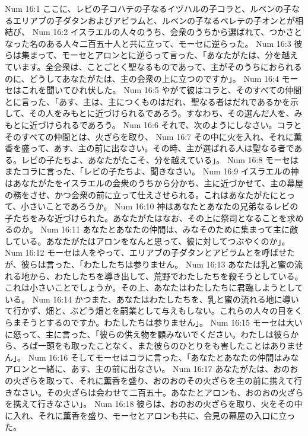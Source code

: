 Num 16:1  ここに、レビの子コハテの子なるイヅハルの子コラと、ルベンの子なるエリアブの子ダタンおよびアビラムと、ルベンの子なるペレテの子オンとが相結び、
Num 16:2  イスラエルの人々のうち、会衆のうちから選ばれて、つかさとなった名のある人々二百五十人と共に立って、モーセに逆らった。
Num 16:3  彼らは集まって、モーセとアロンとに逆らって言った、「あなたがたは、分を越えています。全会衆は、ことごとく聖なるものであって、主がそのうちにおられるのに、どうしてあなたがたは、主の会衆の上に立つのですか」。
Num 16:4  モーセはこれを聞いてひれ伏した。
Num 16:5  やがて彼はコラと、そのすべての仲間とに言った、「あす、主は、主につくものはだれ、聖なる者はだれであるかを示して、その人をみもとに近づけられるであろう。すなわち、その選んだ人を、みもとに近づけられるであろう。
Num 16:6  それで、次のようにしなさい。コラとそのすべての仲間とは、火ざらを取り、
Num 16:7  その中に火を入れ、それに薫香を盛って、あす、主の前に出なさい。その時、主が選ばれる人は聖なる者である。レビの子たちよ、あなたがたこそ、分を越えている」。
Num 16:8  モーセはまたコラに言った、「レビの子たちよ、聞きなさい。
Num 16:9  イスラエルの神はあなたがたをイスラエルの会衆のうちから分かち、主に近づかせて、主の幕屋の務をさせ、かつ会衆の前に立って仕えさせられる。これはあなたがたにとって、小さいことであろうか。
Num 16:10  神はあなたとあなたの兄弟なるレビの子たちをみな近づけられた。あなたがたはなお、その上に祭司となることを求めるのか。
Num 16:11  あなたとあなたの仲間は、みなそのために集まって主に敵している。あなたがたはアロンをなんと思って、彼に対してつぶやくのか」。
Num 16:12  モーセは人をやって、エリアブの子ダタンとアビラムとを呼ばせたが、彼らは言った、「わたしたちは参りません。
Num 16:13  あなたは乳と蜜の流れる地から、わたしたちを導き出して、荒野でわたしたちを殺そうとしている。これは小さいことでしょうか。その上、あなたはわたしたちに君臨しようとしている。
Num 16:14  かつまた、あなたはわたしたちを、乳と蜜の流れる地に導いて行かず、畑と、ぶどう畑とを嗣業として与えもしない。これらの人々の目をくらまそうとするのですか。わたしたちは参りません」。
Num 16:15  モーセは大いに怒って、主に言った、「彼らの供え物を顧みないでください。わたしは彼らから、ろば一頭をも取ったことなく、また彼らのひとりをも害したことはありません」。
Num 16:16  そしてモーセはコラに言った、「あなたとあなたの仲間はみなアロンと一緒に、あす、主の前に出なさい。
Num 16:17  あなたがたは、おのおの火ざらを取って、それに薫香を盛り、おのおのその火ざらを主の前に携えて行きなさい。その火ざらは会わせて二百五十。あなたとアロンも、おのおの火ざらを携えて行きなさい」。
Num 16:18  彼らは、おのおの火ざらを取り、火をその中に入れ、それに薫香を盛り、モーセとアロンも共に、会見の幕屋の入口に立った。

